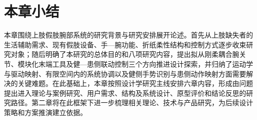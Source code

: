 \section{本章小结}

本章围绕上肢假肢腕部系统的研究背景与研究安排展开论述。首先从上肢缺失者的生活辅助需求、现有假肢设备、手—腕功能、折纸柔性结构和控制方式逐步收束研究对象；随后明确了本研究的总体目的和八项研究内容，提出拟从刚柔耦合腕关节、模块化末端工具及健—患侧联动控制三个方向推进设计探索，并归纳了运动学与驱动映射、有限空间内的系统协调以及健侧手势识别与患侧动作映射方面需要解决的关键难题。在此基础上，本章按照设计学研究主线安排六章内容，形成由问题提出进入理论与案例研究、用户需求、结构及系统设计、原型评价和结论反思的研究路径。第二章将在此框架下进一步梳理相关理论、技术与产品研究，为后续设计策略和方案推演建立依据。

